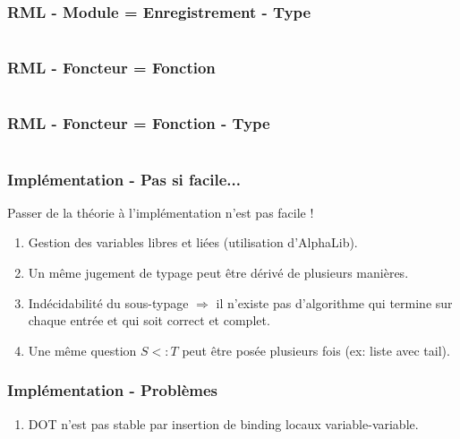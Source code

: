 \documentclass{beamer}
\begin{document}
\begin{frame}
  \frametitle{RML - Module = Enregistrement - Type}
  \inputminted{OCaml}{codes/point2d.rmli}
\end{frame}

\begin{frame}
  \frametitle{RML - Foncteur = Fonction}
  \inputminted{OCaml}{codes/makepoint2d.rml}
\end{frame}

\begin{frame}
  \frametitle{RML - Foncteur = Fonction - Type}
  \inputminted{OCaml}{codes/makepoint2d_sig.rml}
\end{frame}


\begin{frame}
  \frametitle{Implémentation - Pas si facile...}
  Passer de la théorie à l'implémentation n'est pas facile !
  \begin{enumerate}
  \item Gestion des variables libres et liées (utilisation d'AlphaLib).
  \item Un même jugement de typage peut être dérivé de plusieurs manières.
  \item Indécidabilité du sous-typage $\Rightarrow$ il n'existe pas d'algorithme
    qui termine sur chaque entrée et qui soit correct et complet.
  \item Une même question $S <: T$ peut être posée plusieurs fois (ex: liste
    avec tail).
  \end{enumerate}
\end{frame}


\begin{frame}
  \frametitle{Implémentation - Problèmes}
  \begin{enumerate}
  \item DOT n'est pas stable par insertion de binding locaux variable-variable.
    \inputminted{OCaml}{codes/terms_binding_variable.rml}
  \end{enumerate}
\end{frame}
\end{document}
